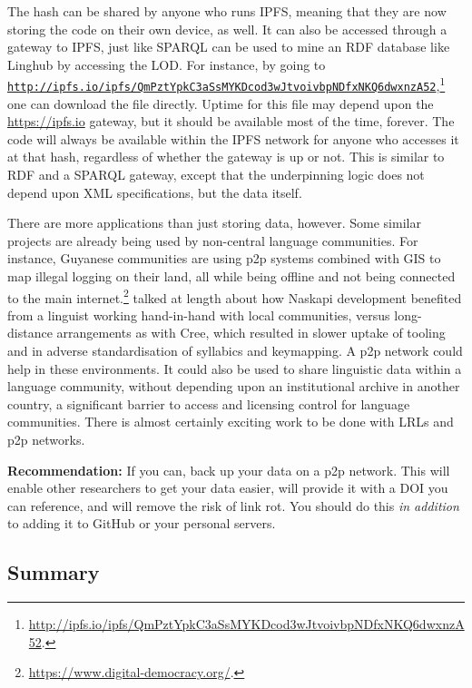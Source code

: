 The hash can be shared by anyone who runs IPFS, meaning that they are now storing the code on their own device, as well. It can also be accessed through a gateway to IPFS, just like SPARQL can be used to mine an RDF database like Linghub by accessing the LOD. For instance, by going to \href{http://ipfs.io/ipfs/QmPztYpkC3aSsMYKDcod3wJtvoivbpNDfxNKQ6dwxnzA52}{\nolinkurl{http://ipfs.io/ipfs/QmPztYpkC3aSsMYKDcod3wJtvoivbpNDfxNKQ6dwxnzA52}},\footnote{\href{http://ipfs.io/ipfs/QmPztYpkC3aSsMYKDcod3wJtvoivbpNDfxNKQ6dwxnzA52}{http://ipfs.io/ipfs/QmPztYpkC3aSsMYKDcod3wJtvoivbpNDfxNKQ6dwxnzA52}. } one can download the file directly. Uptime for this file may depend upon the \href{https://ipfs.io}{https://ipfs.io} gateway, but it should be available most of the time, forever. The code will always be available within the IPFS network for anyone who accesses it at that hash, regardless of whether the gateway is up or not. This is similar to RDF and a SPARQL gateway, except that the underpinning logic does not depend upon XML specifications, but the data itself.

There are more applications than just storing data, however. Some similar projects are already being used by non-central language communities. For instance, Guyanese communities are using p2p systems combined with GIS to map illegal logging on their land, all while being offline and not being connected to the main internet.\footnote{\href{https://www.digital-democracy.org/}{https://www.digital-democracy.org/}. } \citet[90]{jancewicz2002applied} talked at length about how Naskapi development benefited from a linguist working hand-in-hand with local communities, versus long-distance arrangements as with Cree, which resulted in slower uptake of tooling and in adverse standardisation of syllabics and keymapping. A p2p network could help in these environments. It could also be used to share linguistic data within a language community, without depending upon an institutional archive in another country, a significant barrier to access and licensing control for language communities. There is almost certainly exciting work to be done with LRLs and p2p networks.

\textbf{Recommendation:} If you can, back up your data on a p2p network. This will enable other researchers to get your data easier, will provide it with a DOI you can reference, and will remove the risk of link rot. You should do this \textit{in addition} to adding it to GitHub or your personal servers.

\subsection{Summary}

